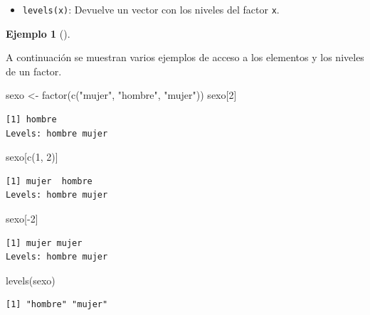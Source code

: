 \documentclass[
  a4paper,
]{scrreport}
\newenvironment{Shaded}{\begin{snugshade}}{\end{snugshade}}
\newcommand{\DecValTok}[1]{\textcolor[rgb]{0.68,0.00,0.00}{#1}}
\newcommand{\FunctionTok}[1]{\textcolor[rgb]{0.28,0.35,0.67}{#1}}
\newcommand{\NormalTok}[1]{\textcolor[rgb]{0.00,0.23,0.31}{#1}}
\newcommand{\OtherTok}[1]{\textcolor[rgb]{0.00,0.23,0.31}{#1}}
\newcommand{\SpecialCharTok}[1]{\textcolor[rgb]{0.37,0.37,0.37}{#1}}
\newcommand{\StringTok}[1]{\textcolor[rgb]{0.13,0.47,0.30}{#1}}
\providecommand{\tightlist}{%
  \setlength{\itemsep}{0pt}\setlength{\parskip}{0pt}}\usepackage{longtable,booktabs,array}
\theoremstyle{definition}
\theoremstyle{definition}
\newtheorem{example}{Ejemplo}[chapter]
\theoremstyle{remark}
\begin{document}
\begin{itemize}
\tightlist
\item
  \texttt{levels(x)}: Devuelve un vector con los niveles del factor
  \texttt{x}.
\end{itemize}

\leavevmode{}%
\begin{example}[]\label{exm-niveles-factor}

A continuación se muestran varios ejemplos de acceso a los elementos y
los niveles de un factor.

\begin{Shaded}
\begin{Highlighting}[]
\NormalTok{sexo }\OtherTok{\textless{}{-}} \FunctionTok{factor}\NormalTok{(}\FunctionTok{c}\NormalTok{(}\StringTok{"mujer"}\NormalTok{, }\StringTok{"hombre"}\NormalTok{, }\StringTok{"mujer"}\NormalTok{))}
\NormalTok{sexo[}\DecValTok{2}\NormalTok{]}
\end{Highlighting}
\end{Shaded}

\begin{verbatim}
[1] hombre
Levels: hombre mujer
\end{verbatim}

\begin{Shaded}
\begin{Highlighting}[]
\NormalTok{sexo[}\FunctionTok{c}\NormalTok{(}\DecValTok{1}\NormalTok{, }\DecValTok{2}\NormalTok{)]}
\end{Highlighting}
\end{Shaded}

\begin{verbatim}
[1] mujer  hombre
Levels: hombre mujer
\end{verbatim}

\begin{Shaded}
\begin{Highlighting}[]
\NormalTok{sexo[}\SpecialCharTok{{-}}\DecValTok{2}\NormalTok{]}
\end{Highlighting}
\end{Shaded}

\begin{verbatim}
[1] mujer mujer
Levels: hombre mujer
\end{verbatim}

\begin{Shaded}
\begin{Highlighting}[]
\FunctionTok{levels}\NormalTok{(sexo)}
\end{Highlighting}
\end{Shaded}

\begin{verbatim}
[1] "hombre" "mujer" 
\end{verbatim}

\end{example}
\end{document}
